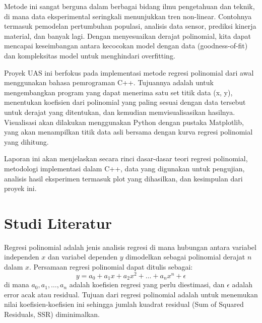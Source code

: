 \documentclass[conference]{IEEEtran}
\begin{document}
Metode ini sangat berguna dalam berbagai bidang ilmu pengetahuan dan teknik, di mana data eksperimental seringkali menunjukkan tren non-linear. Contohnya termasuk pemodelan pertumbuhan populasi, analisis data sensor, prediksi kinerja material, dan banyak lagi. Dengan menyesuaikan derajat polinomial, kita dapat mencapai keseimbangan antara kecocokan model dengan data (goodness-of-fit) dan kompleksitas model untuk menghindari overfitting.

Proyek UAS ini berfokus pada implementasi metode regresi polinomial dari awal menggunakan bahasa pemrograman C++. Tujuannya adalah untuk mengembangkan program yang dapat menerima satu set titik data (x, y), menentukan koefisien dari polinomial yang paling sesuai dengan data tersebut untuk derajat yang ditentukan, dan kemudian memvisualisasikan hasilnya. Visualisasi akan dilakukan menggunakan Python dengan pustaka Matplotlib, yang akan menampilkan titik data asli bersama dengan kurva regresi polinomial yang dihitung.

Laporan ini akan menjelaskan secara rinci dasar-dasar teori regresi polinomial, metodologi implementasi dalam C++, data yang digunakan untuk pengujian, analisis hasil eksperimen termasuk plot yang dihasilkan, dan kesimpulan dari proyek ini.

\section{Studi Literatur}
Regresi polinomial adalah jenis analisis regresi di mana hubungan antara variabel independen $x$ dan variabel dependen $y$ dimodelkan sebagai polinomial derajat $n$ dalam $x$. Persamaan regresi polinomial dapat ditulis sebagai:
\begin{equation}
y = a_0 + a_1x + a_2x^2 + \dots + a_nx^n + \epsilon
\label{eq:poly_reg_func}
\end{equation}
di mana $a_0, a_1, \dots, a_n$ adalah koefisien regresi yang perlu diestimasi, dan $\epsilon$ adalah error acak atau residual. Tujuan dari regresi polinomial adalah untuk menemukan nilai koefisien-koefisien ini sehingga jumlah kuadrat residual (Sum of Squared Residuals, SSR) diminimalkan.
\end{document}
